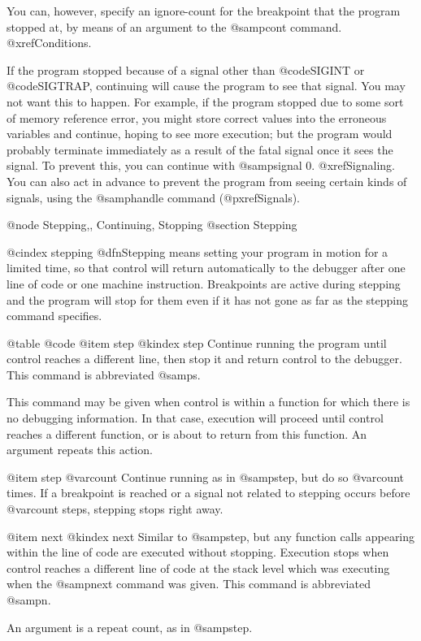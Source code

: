 You can, however, specify an ignore-count for the breakpoint that the
program stopped at, by means of an argument to the @samp{cont} command.
@xref{Conditions}.

If the program stopped because of a signal other than @code{SIGINT} or
@code{SIGTRAP}, continuing will cause the program to see that signal.
You may not want this to happen.  For example, if the program stopped
due to some sort of memory reference error, you might store correct
values into the erroneous variables and continue, hoping to see more
execution; but the program would probably terminate immediately as
a result of the fatal signal once it sees the signal.  To prevent this,
you can continue with @samp{signal 0}.  @xref{Signaling}.  You can
also act in advance to prevent the program from seeing certain kinds
of signals, using the @samp{handle} command (@pxref{Signals}).

@node Stepping,, Continuing, Stopping
@section Stepping

@cindex stepping
@dfn{Stepping} means setting your program in motion for a limited time, so
that control will return automatically to the debugger after one line of
code or one machine instruction.  Breakpoints are active during stepping
and the program will stop for them even if it has not gone as far as the
stepping command specifies.

@table @code
@item step
@kindex step
Continue running the program until control reaches a different line,
then stop it and return control to the debugger.  This command is
abbreviated @samp{s}.

This command may be given when control is within a function for which
there is no debugging information.  In that case, execution will proceed
until control reaches a different function, or is about to return from
this function.  An argument repeats this action.

@item step @var{count}
Continue running as in @samp{step}, but do so @var{count} times.  If a
breakpoint is reached or a signal not related to stepping occurs before
@var{count} steps, stepping stops right away.

@item next
@kindex next
Similar to @samp{step}, but any function calls appearing within the line of
code are executed without stopping.  Execution stops when control reaches a
different line of code at the stack level which was executing when the
@samp{next} command was given.  This command is abbreviated @samp{n}.

An argument is a repeat count, as in @samp{step}.

